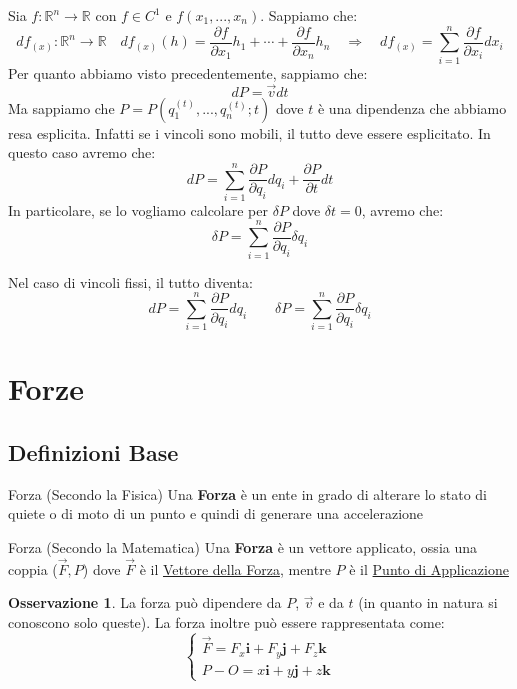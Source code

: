 \documentclass[11pt,a4paper,twoside]{article}
\theoremstyle{definition}
\newtheorem*{oss}{Osservazione}
\begin{document}
Sia $f:\mathbb R^n \to \mathbb R$ con $f \in C^1$ e $f(x_1,...,x_n)$. Sappiamo che:
\[ df_{(x)} : \mathbb R^n \to \mathbb R \quad df_{(x)}(h) = \frac{\partial f}{\partial x_1}h_1 + \cdots + \frac{\partial f}{\partial x_n}h_n \quad \Rightarrow \quad df_{(x)} =  \sum_{i = 1}^n \frac{\partial f}{\partial x_i}dx_i \]
Per quanto abbiamo visto precedentemente, sappiamo che: \[ dP = \vec v dt \]
Ma sappiamo che $P = P(q_1^{(t)},...,q_n^{(t)};t)$ dove $t$ è una dipendenza che abbiamo resa esplicita. Infatti se i vincoli sono mobili, il tutto deve essere esplicitato. In questo caso avremo che:
\[ dP = \sum_{i = 1}^n \frac{\partial P}{\partial q_i}dq_i + \frac{\partial P}{\partial t}dt \]
In particolare, se lo vogliamo calcolare per $\delta P$ dove $\delta t=0$, avremo che:
\[ \delta P = \sum_{i = 1}^n \frac{\partial P}{\partial q_i}\delta q_i \]

Nel caso di vincoli fissi, il tutto diventa:
\[ dP = \sum_{i = 1}^n \frac{\partial P}{\partial q_i}dq_i \qquad \delta P = \sum_{i = 1}^n \frac{\partial P}{\partial q_i}\delta q_i \]

\newpage

\section{Forze}

\subsection{Definizioni Base}

\begin{defn}{Forza (Secondo la Fisica)}{}
	Una \textbf{Forza} è un ente in grado di alterare lo stato di quiete o di moto di un punto e quindi di generare una accelerazione
\end{defn}

\begin{defn}{Forza (Secondo la Matematica)}{}
	Una \textbf{Forza} è un vettore applicato, ossia una coppia ($\vec F, P$) dove $\vec F$ è il \underline{Vettore della Forza}, mentre $P$ è il \underline{Punto di Applicazione}
\end{defn}

\begin{oss}
	La forza può dipendere da $P$, $\vec v$ e da $t$ (in quanto in natura si conoscono solo queste). La forza inoltre può essere rappresentata come:
	\[ \begin{cases}
		\vec F = F_x \mathbf i + F_y \mathbf j + F_z \mathbf k\\
		P-O = x \mathbf i+ y \mathbf j + z \mathbf k
	\end{cases}\]
\end{oss}
\end{document}
